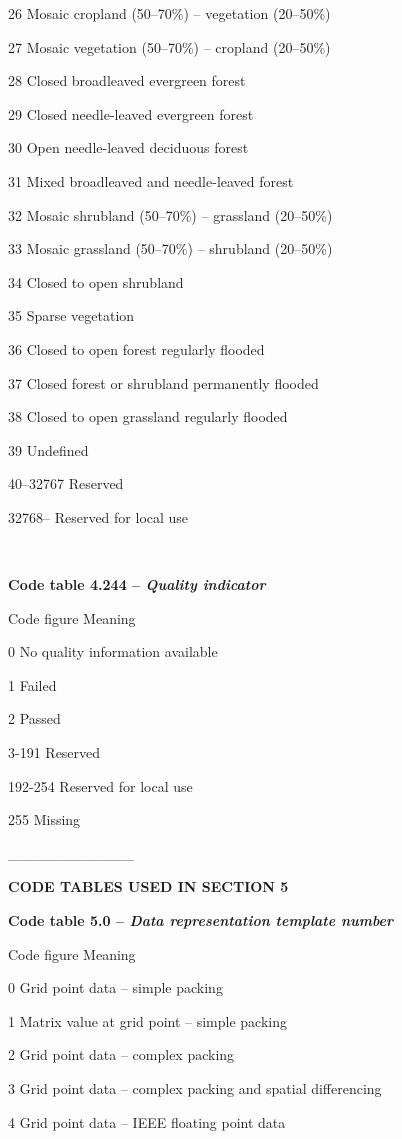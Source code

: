 26 Mosaic cropland (50--70\%) -- vegetation (20--50\%)

27 Mosaic vegetation (50--70\%) -- cropland (20--50\%)

28 Closed broadleaved evergreen forest

29 Closed needle-leaved evergreen forest

30 Open needle-leaved deciduous forest

31 Mixed broadleaved and needle-leaved forest

32 Mosaic shrubland (50--70\%) -- grassland (20--50\%)

33 Mosaic grassland (50--70\%) -- shrubland (20--50\%)

34 Closed to open shrubland

35 Sparse vegetation

36 Closed to open forest regularly flooded

37 Closed forest or shrubland permanently flooded

38 Closed to open grassland regularly flooded

39 Undefined

40--32767 Reserved

32768-- Reserved for local use

\textbf{\\
}

\textbf{Code table 4.244 -- \emph{Quality indicator}}

Code figure Meaning

0 No quality information available

1 Failed

2 Passed

3-191 Reserved

192-254 Reserved for local use

255 Missing

\_\_\_\_\_\_\_\_\_\_\_\_

\textbf{CODE TABLES USED IN SECTION 5}

\textbf{Code table 5.0 -- \emph{Data representation template number}}

Code figure Meaning

0 Grid point data -- simple packing

1 Matrix value at grid point -- simple packing

2 Grid point data -- complex packing

3 Grid point data -- complex packing and spatial differencing

4 Grid point data -- IEEE floating point data

